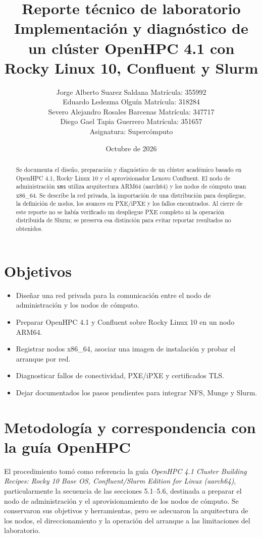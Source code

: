 \documentclass[12pt,a4paper]{article}
\title{\textbf{Reporte técnico de laboratorio}\\[0.4em]\Large Implementación y diagnóstico de un clúster OpenHPC 4.1 con Rocky Linux 10, Confluent y Slurm}
\author{Jorge Alberto Suarez Saldana Matrícula: 355992\\
Eduardo Ledezma Olguín Matrícula: 318284\\
Severo Alejandro Rosales Barcenas Matrícula: 347717\\
Diego Gael Tapia Guerrero Matrícula: 351657\\
Asignatura: Supercómputo}
\date{Octubre de 2026}
\begin{document}
\maketitle
\begin{abstract}
Se documenta el diseño, preparación y diagnóstico de un clúster académico basado en OpenHPC 4.1, Rocky Linux 10 y el aprovisionador Lenovo Confluent. El nodo de administración \texttt{sms} utiliza arquitectura ARM64 (aarch64) y los nodos de cómputo usan x86\_64. Se describe la red privada, la importación de una distribución para despliegue, la definición de nodos, los avances en PXE/iPXE y los fallos encontrados. Al cierre de este reporte no se había verificado un despliegue PXE completo ni la operación distribuida de Slurm; se preserva esa distinción para evitar reportar resultados no obtenidos.
\end{abstract}
\tableofcontents\newpage

\section{Objetivos}
\begin{itemize}
\item Diseñar una red privada para la comunicación entre el nodo de administración y los nodos de cómputo.
\item Preparar OpenHPC 4.1 y Confluent sobre Rocky Linux 10 en un nodo ARM64.
\item Registrar nodos x86\_64, asociar una imagen de instalación y probar el arranque por red.
\item Diagnosticar fallos de conectividad, PXE/iPXE y certificados TLS.
\item Dejar documentados los pasos pendientes para integrar NFS, Munge y Slurm.
\end{itemize}

\section{Metodología y correspondencia con la guía OpenHPC}
\label{sec:metodologia}
El procedimiento tomó como referencia la guía \emph{OpenHPC 4.1 Cluster Building Recipes: Rocky 10 Base OS, Confluent/Slurm Edition for Linux (aarch64)}, particularmente la secuencia de las secciones 5.1--5.6, destinada a preparar el nodo de administración y el aprovisionamiento de los nodos de cómputo. Se conservaron sus objetivos y herramientas, pero se adecuaron la arquitectura de los nodos, el direccionamiento y la operación del arranque a las limitaciones del laboratorio.
\end{document}
